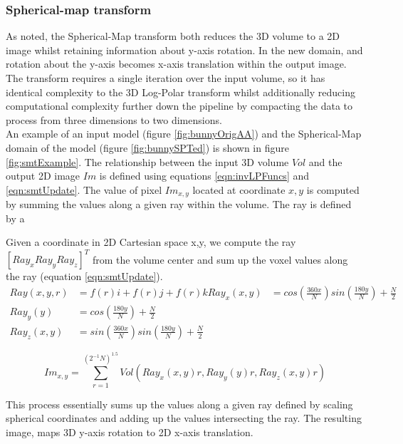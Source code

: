 \subsubsection{Spherical-map transform}
\label{SMTransform}

As noted, the Spherical-Map transform both reduces the 3D volume to a 2D image whilst retaining information about y-axis rotation. In the new domain, and rotation about the y-axis becomes x-axis translation within the output image. The transform requires a single iteration over the input volume, so it has identical complexity to the 3D Log-Polar transform whilst additionally reducing computational complexity further down the pipeline by compacting the data to process from three dimensions to two dimensions.  \\

An example of an input model (figure \ref{fig:bunnyOrigAA}) and the Spherical-Map domain of the model (figure \ref{fig:bunnySPTed}) is shown in figure \ref{fig:smtExample}. The relationship between the input 3D volume $Vol$ and the output 2D image $Im$ is defined using equations \ref{eqn:invLPFuncs} and \ref{eqn:smtUpdate}. The value of pixel $Im_{x,y}$ located at coordinate $x,y$ is computed by summing the values along a given ray within the volume. The ray is defined by a  


Given a coordinate in 2D Cartesian space x,y, we compute the ray $[Ray_x Ray_y Ray_z]^T$ from the volume center and sum up the voxel values along the ray (equation \ref{eqn:smtUpdate}). \\


\begin{equation} \label{eqn:invLPFuncs}
\begin{split}
Ray(x,y,r) & = f(r)i + f(r)j + f(r)k
Ray_x(x,y) & = cos\left(\frac{360x}{N}\right)sin\left(\frac{180y}{N}\right)  + \frac{N}{2} \\
Ray_y(y) & = cos\left(\frac{180y}{N}\right) + \frac{N}{2} \\
Ray_z(x,y) & = 	sin\left(\frac{360x}{N}\right)sin\left(\frac{180y}{N}\right) + \frac{N}{2}
\end{split}
\end{equation}

\begin{equation} \label{eqn:smtUpdate}
Im_{x,y} = \sum_{r=1}^{(2^{-1}N)^{1.5}}{Vol(Ray_x(x,y)r, Ray_y(y)r, Ray_z(x,y)r)} 
\end{equation}

This process essentially sums up the values along a given ray defined by scaling spherical coordinates and adding up the values intersecting the ray. The resulting image, maps 3D y-axis rotation to 2D x-axis translation.  \\

